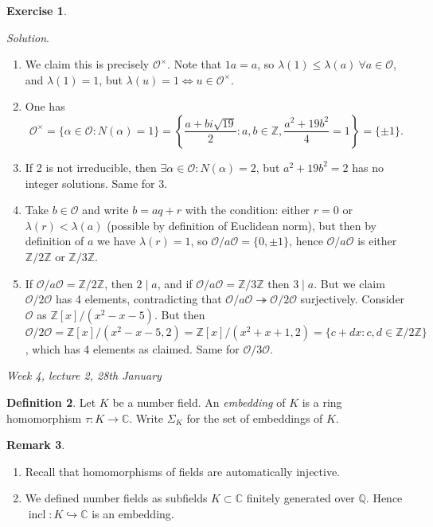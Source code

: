 \documentclass{article}
\newcommand{\Z}{\mathbb{Z}}
\newcommand{\Q}{\mathbb{Q}}
\newcommand{\C}{\mathbb{C}}
\newcommand{\ri}{\mathcal{O}}
\theoremstyle{definition}
\newtheorem{defn}{Definition}[subsection]
\newtheorem{exe}[defn]{Exercise}
\newtheorem{remark}[defn]{Remark}
\begin{document}
\begin{exe}
\begin{enumerate}
\textit{Solution}.
\begin{enumerate}
\item We claim this is precisely $\ri^\times$. Note that $1a=a$, so $\lambda(1)\leq\lambda(a) \ \forall a\in\ri$, and $\lambda(1)=1$, but $\lambda(u)=1\iff u\in\ri^\times$.
\item One has
\[
\ri^\times=\{\alpha\in\ri:N(\alpha)=1\}=\left\{\frac{a+bi\sqrt{19}}{2}:a,b\in\Z,\frac{a^2+19b^2}{4}=1\right\}=\{\pm 1\}.
\]
\item If 2 is not irreducible, then $\exists\alpha\in\ri :N(\alpha)=2$, but $a^2+19b^2=2$ has no integer solutions. Same for 3.
\item Take $b\in\ri$ and write $b=aq+r$ with the condition: either $r=0$ or $\lambda(r)<\lambda(a)$ (possible by definition of Euclidean norm), but then by definition of $a$ we have $\lambda(r)=1$, so $\ri/a\ri=\{0,\pm 1\}$, hence $\ri/a\ri$ is either $\Z/2\Z$ or $\Z/3\Z$.
\item If $\ri/a\ri=\Z/2\Z$, then $2\mid a$, and if $\ri/a\ri=\Z/3\Z$ then $3\mid a$. But we claim $\ri/2\ri$ has 4 elements, contradicting that $\ri/a\ri\twoheadrightarrow\ri/2\ri$ surjectively. Consider $\ri$ as $\Z[x]/(x^2-x-5)$. But then $\ri/2\ri=\Z[x]/(x^2-x-5,2)=\Z[x]/(x^2+x+1,2)=\{c+dx:c,d\in\Z/2\Z\}$, which has 4 elements as claimed. Same for $\ri/3\ri$.
\end{enumerate}
\end{enumerate}
\end{exe}

\begin{flushright}
\textit{Week 4, lecture 2, 28th January}
\end{flushright}

\begin{defn}
Let $K$ be a number field. An \textit{embedding} of $K$ is a ring homomorphism $\tau:K\rightarrow\C$. Write $\Sigma_K$ for the set of embeddings of $K$.
\end{defn}

\begin{remark}
\begin{enumerate}
\item Recall that homomorphisms of fields are automatically injective.
\item We defined number fields as subfields $K\subset\C$ finitely generated over $\Q$. Hence $\operatorname{incl}:K\hookrightarrow\C$ is an embedding.
\end{enumerate}
\end{remark}
\end{document}
